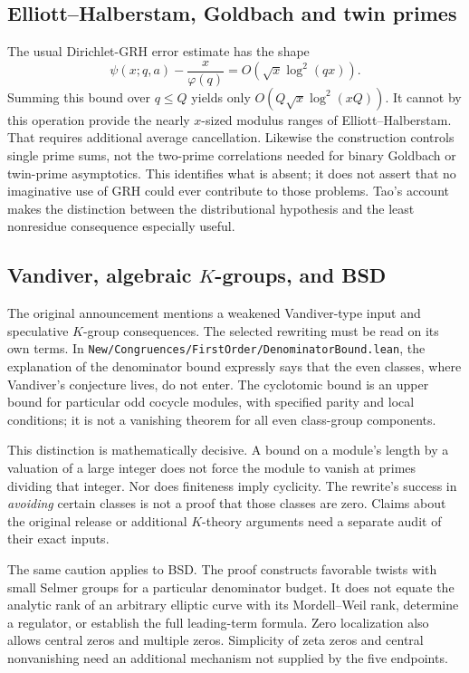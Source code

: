 \documentclass[11pt,letterpaper]{article}
\theoremstyle{definition}\newtheorem{definition}[theorem]{Definition}
\theoremstyle{remark}\newtheorem{remark}[theorem]{Remark}
\newcommand{\src}[1]{\nolinkurl{#1}}
\begin{document}
\subsection{Elliott--Halberstam, Goldbach and twin primes}
The usual Dirichlet-GRH error estimate has the shape
\[
 \psi(x;q,a)-\frac{x}{\varphi(q)}
 =O\!\left(\sqrt x\log^2(qx)\right).
\]
Summing this bound over $q\le Q$ yields only
$O(Q\sqrt x\log^2(xQ))$. It cannot by this operation provide the nearly $x$-sized modulus
ranges of Elliott--Halberstam. That requires additional average cancellation.
Likewise the construction controls single prime sums, not the two-prime correlations needed
for binary Goldbach or twin-prime asymptotics. This identifies what is absent; it does not
assert that no imaginative use of GRH could ever contribute to those problems.
Tao's account makes the distinction between the distributional hypothesis and the least
nonresidue consequence especially useful.\cite{tao}

\subsection{Vandiver, algebraic \texorpdfstring{$K$}{K}-groups, and BSD}
The original announcement mentions a weakened Vandiver-type input and speculative
$K$-group consequences. The selected rewriting must be read on its own terms.
In \src{New/Congruences/FirstOrder/DenominatorBound.lean}, the explanation of the denominator
bound expressly says that the even classes, where Vandiver's conjecture lives, do not enter.
The cyclotomic bound  is an upper bound for particular
odd cocycle modules, with specified parity and local conditions; it is not a vanishing theorem
for all even class-group components.\cite{announcement,denominators,oddsha}

This distinction is mathematically decisive. A bound on a module's length by a valuation of
a large integer does not force the module to vanish at primes dividing that integer. Nor does
finiteness imply cyclicity. The rewrite's success in \emph{avoiding} certain classes is not a
proof that those classes are zero. Claims about the original release or additional
$K$-theory arguments need a separate audit of their exact inputs.

The same caution applies to BSD. The proof constructs favorable twists with small Selmer
groups for a particular denominator budget. It does not equate the analytic rank of an arbitrary
elliptic curve with its Mordell--Weil rank, determine a regulator, or establish the full leading-term
formula. Zero localization also allows central zeros and multiple zeros. Simplicity of zeta
zeros and central nonvanishing need an additional mechanism not supplied by the five endpoints.
\end{document}
